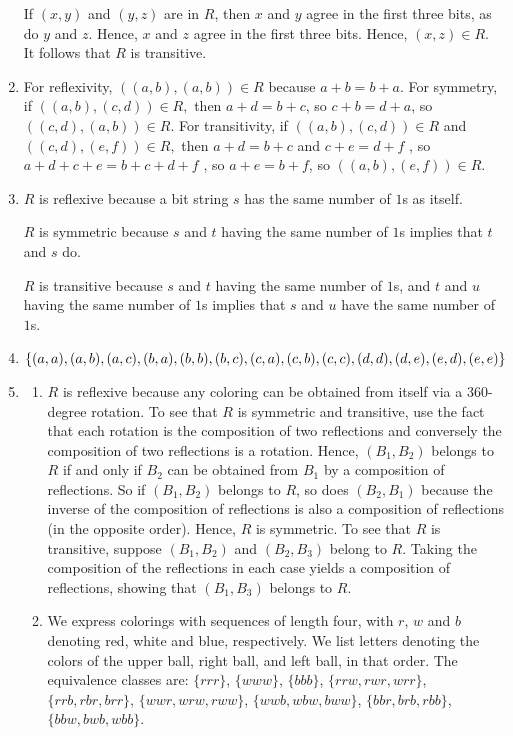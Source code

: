 \documentclass{sig-alternate-05-2015}
\begin{document}
\begin{enumerate}
If $(x, y)$ and $(y, z)$ are in $R$, then
$x$ and $y$ agree in the first three bits, as do $y$ and $z$. Hence, $x$
and $z$ agree in the first three bits. Hence, $(x, z) \in R.$ It follows
that $R$ is transitive.

\item
For reflexivity,
$((a, b), (a, b))\in R$ because $a +b = b +a$. For symmetry, if
$((a, b), (c, d))\in R,$ then $a + d = b + c$, so $c + b = d + a$,
so $((c, d), (a, b))\in R.$ For transitivity, if $((a, b), (c, d)) \in R$
 and $((c, d), (e, f )) \in R,$ then $a+d = b+c$ and $c+e = d+f$ ,
so $a + d + c + e = b + c + d + f$ , so $a + e = b + f $,
so $((a, b), (e, f ))\in R.$ 

\item $R$ is reflexive because a bit string $s$ has the same 
number of $1$s as itself. 

$R$ is symmetric because
$s$ and $t$ having the same number of $1$s implies that $t$ and $s$ do.

$R$ is transitive because $s$ and $t$ having the same number of $1$s,
and $t$ and $u$ having the same number of $1$s implies that $s$ and
$u$ have the same number of $1$s.

\item $\{(a, a), (a, b),
	(a, c), (b, a), (b, b), (b, c), (c, a),\\ (c, b), (c, c), (d, d), (d, e),
	(e, d), (e, e)\}$

\item 
\begin{enumerate}
	\item $R$ is
	reflexive because any coloring can be obtained from itself via
	a 360-degree rotation. To see that $R$ is symmetric and transitive,
	use the fact that each rotation is the composition of two reflections and conversely the composition of two reflections
	is a rotation. Hence, $(B_1, B_2)$ belongs to $R$ if and only
	if $B_2$ can be obtained from $B_1$ by a composition of reflections.
	So if $(B_1, B_2)$ belongs to $R$, so does $(B_2, B_1)$ because
	the inverse of the composition of reflections is also a composition
	of reflections (in the opposite order). Hence, $R$ is
	symmetric. To see that $R$ is transitive, suppose $(B_1, B_2)$ and
	$(B_2, B_3)$ belong to $R$. Taking the composition of the reflections
	in each case yields a composition of reflections, showing
	that $(B_1,B_3)$ belongs to $R$. 
	\item We express colorings with sequences
	of length four, with $r$, $w$ and $b$ denoting red, white and blue,
	respectively. We list letters denoting the colors of the upper
	ball, right ball, and left ball, in that order. The equivalence classes are: $\{rrr\}$, $\{www\}$, $\{bbb\}$, $\{rrw, rwr, wrr\}$, $\{rrb, rbr, brr\}$, $\{wwr, wrw, rww\}$, $\{wwb, wbw, bww\}$, $\{bbr, brb, rbb\}$, $\{bbw, bwb, wbb\}$.
\end{enumerate}


\end{enumerate}
\end{document}
